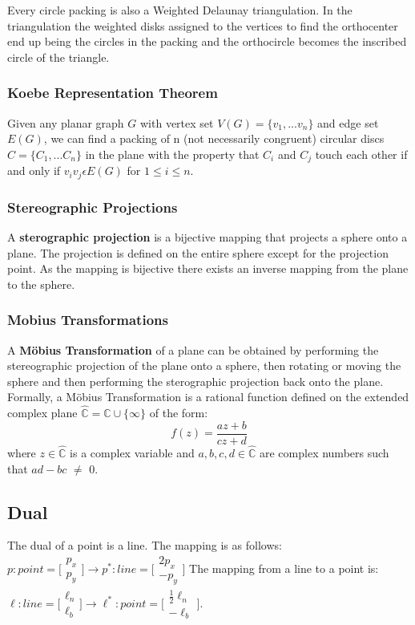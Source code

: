\documentclass[english]{article}
\newcommand{\vect}[2]{\bigl[\begin{smallmatrix}#1\\#2\end{smallmatrix}\bigr]}
\newcommand{\C}{\mathbb{C}}
\newcommand{\CP}{\hat{\mathbb{C}}}
\begin{document}
    Every circle packing is also a Weighted Delaunay triangulation. In the triangulation the weighted disks assigned to the vertices to find the orthocenter end up being the circles in the packing and the orthocircle becomes the inscribed circle of the triangle. 
    
    \subsubsection{Koebe Representation Theorem}
    Given any planar graph $G$ with vertex set $V(G) = \{v_1, ... v_n \}$ and edge set $E(G)$, we can find a packing of n (not necessarily congruent) circular discs $C= \{C_1,... C_n\}$ in the plane with the property that $C_i$ and $C_j$ touch each other if and only if $v_i v_j \epsilon E(G)$ for $1 \le i \le n$.
    \subsubsection{Stereographic Projections}
    A \textbf{sterographic projection} is a bijective mapping that projects a sphere onto a plane.
     The projection is defined on the entire sphere except for the projection point. 
    As the mapping is bijective there exists an inverse mapping from the plane to the sphere.

    \subsubsection{Mobius Transformations}
    A \textbf{M\"{o}bius Transformation} of a plane can be obtained by performing the stereographic projection of the plane onto a sphere, then rotating or moving the sphere and then performing the sterographic projection back onto the plane. 
    Formally, a M\"{o}bius Transformation is a rational function defined on the extended complex plane $\CP = \C\cup\{\infty\}$ of the form:
    \begin{equation} 
    	f(z) = \frac{az+b}{cz+d}
    \end{equation}
    where $z\in\CP$ is a complex variable and $a,b,c,d\in\CP$ are complex numbers such that $ad - bc$ $\neq$ $0$.
 
 \subsection{Dual}
  The dual of a point is a line. The mapping is as follows: $p : point = \vect{p_x}{p_y} \rightarrow p^* : line = \vect{2p_x}{-p_y}$ The mapping from a line to a point is: $\ell : line = \vect{\ell_n}{\ell_b} \rightarrow \ell^* : point = \vect{\frac{1}{2}\ell_n}{-\ell_b}$.
  
\end{document}
